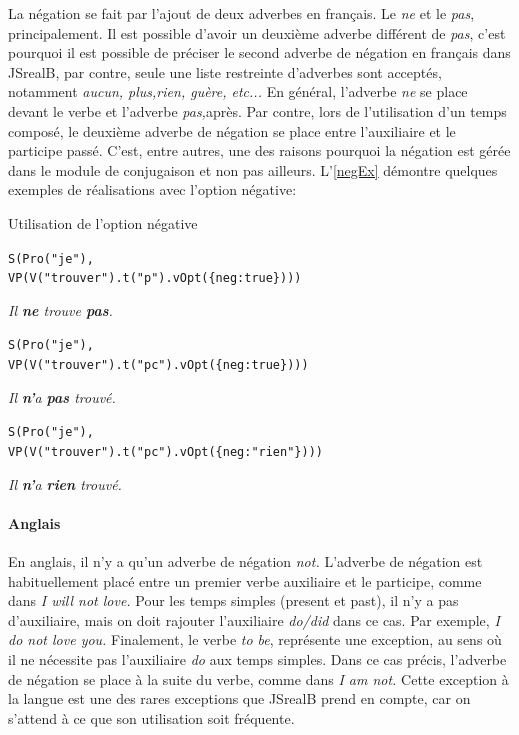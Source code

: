 \documentclass[11pt]{article} %
\newcommand{\system}[1]{\textsf{#1}}
\newcommand{\JSB}{\system{JSrealB}}
\newcommand{\real}[1]{\emph{#1}}
\begin{document}
La négation se fait par l'ajout de deux adverbes en français. Le \emph{ne}
et le \emph{pas}, principalement. Il est possible d'avoir un
deuxième adverbe différent de \emph{pas}, c'est pourquoi il est possible
de préciser le second adverbe de négation en français dans \JSB{},
par contre, seule une liste restreinte d'adverbes sont acceptés, notamment
\emph{aucun, plus,rien, guère, etc... }En général, l'adverbe
\emph{ne }se place devant le verbe et l'adverbe \emph{pas,}après.
Par contre, lors de l'utilisation d'un temps composé, le deuxième
adverbe de négation se place entre l'auxiliaire et le participe passé.
C'est, entre autres, une des raisons pourquoi la négation est gérée
dans le module de conjugaison et non pas ailleurs. L'\autoref{negEx} démontre quelques
exemples de réalisations avec l'option négative:
\begin{example}
\caption{Utilisation de l'option négative}
\begin{alltt}
S(Pro("je"),
  VP(V("trouver").t("p").vOpt(\{neg:true\})))
\end{alltt}
\real{Il \textbf{ne} trouve \textbf{pas}.}\\

\begin{alltt}
S(Pro("je"),
  VP(V("trouver").t("pc").vOpt(\{neg:true\})))
\end{alltt}
\real{Il \textbf{n'}a \textbf{pas} trouvé.}\\

\begin{alltt}
S(Pro("je"),
  VP(V("trouver").t("pc").vOpt(\{neg:"rien"\})))
\end{alltt}
\real{Il \textbf{n'}a \textbf{rien} trouvé.}\\
\label{negEx}
\end{example}

\paragraph{Anglais}

En anglais, il n'y a qu'un adverbe de négation 
\emph{not. }L'adverbe de négation est habituellement placé entre un
premier verbe auxiliaire et le participe, comme dans \emph{I will
not love. }Pour les temps simples (present et past), il n'y a pas d'auxiliaire,
mais on doit rajouter l'auxiliaire \emph{do/did} dans ce cas. Par
exemple, \emph{I do not love you. }Finalement, le verbe \emph{to be},
représente une exception, au sens où il ne nécessite pas l'auxiliaire
\emph{do }aux temps simples. Dans ce cas précis, l'adverbe de négation
se place à la suite du verbe, comme dans \emph{I am not.} Cette exception
à la langue est une des rares exceptions que \JSB{} prend en compte,
car on s'attend à ce que son utilisation soit fréquente.
\end{document}
